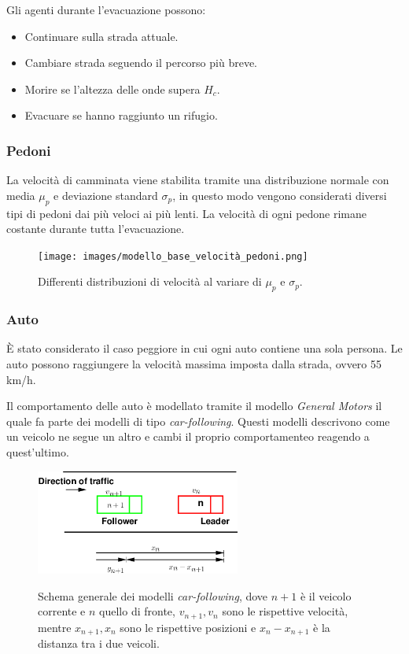 \vspace*{4mm}

\noindent
Gli agenti durante l'evacuazione possono:
\begin{itemize}
  \item Continuare sulla strada attuale.
  \item Cambiare strada seguendo il percorso più breve.
  \item Morire se l'altezza delle onde supera $H_c$.
  \item Evacuare se hanno raggiunto un rifugio.
\end{itemize}

\subsubsection{Pedoni}
La velocità di camminata viene stabilita tramite una distribuzione normale
con media $\mu_p$ e deviazione standard $\sigma_p$, in questo modo vengono considerati diversi tipi di pedoni dai più veloci ai più lenti.
La velocità di ogni pedone rimane costante durante tutta l'evacuazione.

\begin{figure}[ht]
  \centering
  \texttt{[image: images/modello\_base\_velocità\_pedoni.png]}
  \label{fig:modello-base-velocità-pedoni-img}
  \caption{Differenti distribuzioni di velocità al variare di $\mu_p$ e $\sigma_p$.}
\end{figure}

\subsubsection{Auto}
È stato considerato il caso peggiore in cui ogni auto contiene una sola persona.
Le auto possono raggiungere la velocità massima imposta dalla strada, ovvero 55 km/h.

Il comportamento delle auto è modellato tramite il modello \textit{General Motors} il quale fa parte dei modelli
di tipo \textit{car-following}. Questi modelli descrivono come un veicolo ne segue un altro
e cambi il proprio comportamenteo reagendo a quest'ultimo.

\begin{figure}[ht]
  \centering
  \includegraphics[width=0.6\textwidth]{images/GM.png}
  \label{fig:general-motors-img}
  \caption{Schema generale dei modelli \textit{car-following}, dove $n+1$ è il veicolo corrente e $n$ quello di fronte, 
  $v_{n+1}, v_{n}$ sono le rispettive velocità, mentre $x_{n+1}, x_{n}$ sono le rispettive posizioni e $x_{n} - x_{n + 1}$ è la distanza tra i due veicoli.}
\end{figure}

